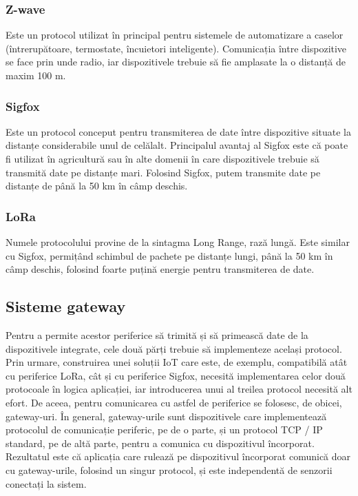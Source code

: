 \subsubsection{Z-wave}
\label{sec:embed:bus:wireless:zwave}

Este un protocol utilizat în principal pentru sistemele de automatizare a caselor (întrerupătoare, termostate, încuietori inteligente).
Comunicația între dispozitive se face prin unde radio, iar dispozitivele trebuie să fie amplasate la o distanță de maxim 100 m.

\subsubsection{Sigfox}
\label{sec:embed:bus:wireless:sigfox}

Este un protocol conceput pentru transmiterea de date între dispozitive situate la distanțe considerabile unul de celălalt.
Principalul avantaj al Sigfox este că poate fi utilizat în agricultură sau în alte domenii în care dispozitivele trebuie să transmită date pe distanțe mari.
Folosind Sigfox, putem transmite date pe distanțe de până la 50 km în câmp deschis.

\subsubsection{LoRa}
\label{sec:embed:bus:wireless:lora}

Numele protocolului provine de la sintagma Long Range, rază lungă.
Este similar cu Sigfox, permițând schimbul de pachete pe distanțe lungi, până la 50 km în câmp deschis, folosind foarte puțină energie pentru transmiterea de date.

\subsection{Sisteme gateway}
\label{sec:embed:bus:gateway}

Pentru a permite acestor periferice să trimită și să primească date de la dispozitivele integrate, cele două părți trebuie să implementeze același protocol.
Prin urmare, construirea unei soluții IoT care este, de exemplu, compatibilă atât cu periferice LoRa, cât și cu periferice Sigfox, necesită implementarea celor două protocoale în logica aplicației, iar introducerea unui al treilea protocol necesită alt efort.
De aceea, pentru comunicarea cu astfel de periferice se folosesc, de obicei, gateway-uri.
În general, gateway-urile sunt dispozitivele care implementează protocolul de comunicație periferic, pe de o parte, și un protocol TCP / IP standard, pe de altă parte, pentru a comunica cu dispozitivul încorporat.
Rezultatul este că aplicația care rulează pe dispozitivul încorporat comunică doar cu gateway-urile, folosind un singur protocol, și este independentă de senzorii conectați la sistem.

